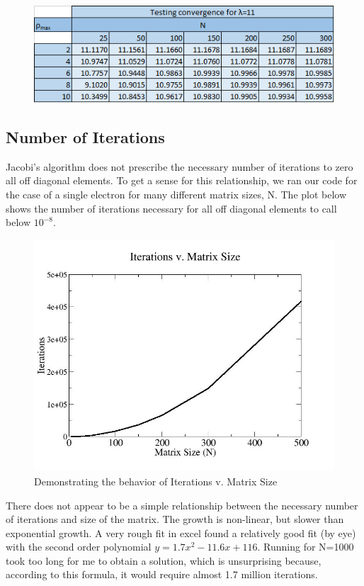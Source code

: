 \documentclass[%
oneside,                 %
final,                   %
10pt]{article}
\begin{document}
\begin{figure}[H]\label{fig:11}
  \centering
    \includegraphics[width=1.1\textwidth]{11.png}
\end{figure}

\subsection{Number of Iterations}

Jacobi's algorithm does not prescribe the necessary number of iterations to zero all off diagonal elements.  To get a sense for this relationship, we ran our code for the case of a single electron for many different matrix sizes, N.  The plot below shows the number of iterations necessary for all off diagonal elements to call below $10^{-8}$.

\begin{figure}[H]\label{fig:iteration}
  \centering
    \includegraphics[width=1.1\textwidth]{iterationplot.jpg}
    \caption{Demonstrating the behavior of Iterations v. Matrix Size}
\end{figure}

There does not appear to be a simple relationship between the necessary number of iterations and size of the matrix.  The growth is non-linear, but slower than exponential growth.  A very rough fit in excel found a relatively good fit (by eye) with the second order polynomial $y = 1.7 x^2 - 11.6 x + 116$.  Running for N=1000 took too long for me to obtain a solution, which is unsurprising because, according to this formula, it would require almost 1.7 million iterations.
\end{document}
